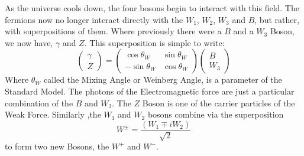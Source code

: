 As the universe cools down, the four bosons begin to interact with this field. The fermions now no longer interact directly with the $W_1$, $W_2$, $W_3$ and $B$, but rather, with superpositions of them. Where previously there were a $B$ and a $W_3$ Boson, we now have, $\gamma$ and $Z$. This superposition is simple to write:
\begin{equation}
    \left( \begin{array}{c} \gamma \\ Z \end{array} \right) = \left( \begin{array}{c} \cos\theta_W \\ -\sin\theta_W \end{array} \begin{array}{c} \sin\theta_W \\ \cos\theta_W \end{array} \right) \left( \begin{array}{c} B \\ W_3 \end{array} \right)
\end{equation}
Where $\theta_W$ called the Mixing Angle or Weinberg Angle, is a parameter of the Standard Model. The photons of the Electromagnetic force are just a particular combination of the $B$ and $W_3$. The $Z$ Boson is one of the carrier particles of the Weak Force. Similarly ,the $W_1$ and $W_2$ bosons combine via the superposition
\begin{equation}
    W^\pm = \frac{(W_1\mp iW_2)}{\sqrt{2}}
\end{equation}
to form two new Bosons, the $W^+$ and $W^-$. 

